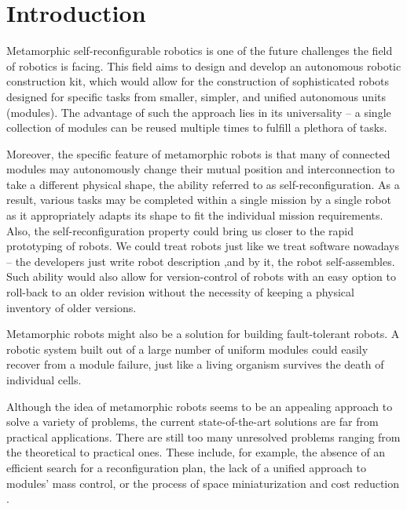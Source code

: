 \chapter{Introduction}\label{chap:introduciton}

Metamorphic self-reconfigurable robotics is one of the future challenges the
field of robotics is facing. This field aims to design and develop an
autonomous robotic construction kit, which would allow for the construction of
sophisticated robots designed for specific tasks from smaller, simpler, and
unified autonomous units (modules). The advantage of such the approach lies in
its universality -- a single collection of modules can be reused multiple times
to fulfill a plethora of tasks.

Moreover, the specific feature of metamorphic robots is that many of connected
modules may autonomously change their mutual position and interconnection to
take a different physical shape, the ability referred to as
self-reconfiguration. As a result, various tasks may be completed within a
single mission by a single robot as it appropriately adapts its shape to fit the
individual mission requirements. Also, the self-reconfiguration property could
bring us closer to the rapid prototyping of robots. We could treat robots just
like we treat software nowadays -- the developers just write robot description
,and by  it, the robot self-assembles. Such ability would also
allow for version-control of robots with an easy option to roll-back to an older
revision without the necessity of keeping a physical inventory of older
versions.

Metamorphic robots might also be a solution for building fault-tolerant robots.
A robotic system built out of a large number of uniform modules could easily
recover from a module failure, just like a living organism survives the death of
individual cells.

Although the idea of metamorphic robots seems to be an appealing approach to
solve a variety of problems, the current state-of-the-art solutions are far from
practical applications. There are still too many unresolved problems ranging
from the theoretical to practical ones. These include, for example, the absence
of an efficient search for a reconfiguration plan, the lack of a unified
approach to modules' mass control, or the process of space miniaturization and
cost reduction \cite{4141032}.

